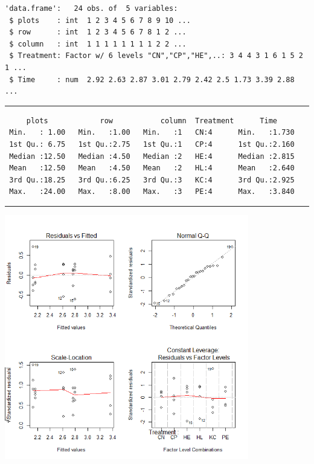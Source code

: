 \documentclass[a4paper, 10pt, fleqn, twosided]{memoir}
\begin{document}
\begin{tcolorbox}[title = Exercise 2 output]
\begin{verbatim}
'data.frame':   24 obs. of  5 variables:
 $ plots    : int  1 2 3 4 5 6 7 8 9 10 ...
 $ row      : int  1 2 3 4 5 6 7 8 1 2 ...
 $ column   : int  1 1 1 1 1 1 1 1 2 2 ...
 $ Treatment: Factor w/ 6 levels "CN","CP","HE",..: 3 4 4 3 1 6 1 5 2 1 ...
 $ Time     : num  2.92 2.63 2.87 3.01 2.79 2.42 2.5 1.73 3.39 2.88 ...
\end{verbatim}
{\color{outpt} {\hrule height 1pt}}
\begin{verbatim}
     plots            row           column  Treatment      Time
 Min.   : 1.00   Min.   :1.00   Min.   :1   CN:4      Min.   :1.730
 1st Qu.: 6.75   1st Qu.:2.75   1st Qu.:1   CP:4      1st Qu.:2.160
 Median :12.50   Median :4.50   Median :2   HE:4      Median :2.815
 Mean   :12.50   Mean   :4.50   Mean   :2   HL:4      Mean   :2.640
 3rd Qu.:18.25   3rd Qu.:6.25   3rd Qu.:3   KC:4      3rd Qu.:2.925
 Max.   :24.00   Max.   :8.00   Max.   :3   PE:4      Max.   :3.840
 \end{verbatim}
{\color{outpt} {\hrule height 1pt}}
\includegraphics[width=0.8\textwidth, frame]{Exercise2Resplot.png}
\end{tcolorbox}
\end{document}
